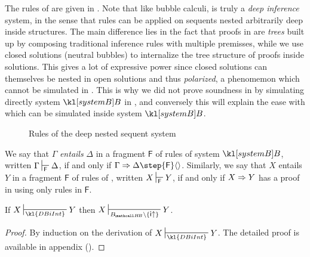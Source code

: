 The rules of  are given in . Note that like
bubble calculi,  is truly a \emph{deep inference} system, in the
sense that rules can be applied on sequents nested arbitrarily deep inside
structures. The main difference lies in the fact that
proofs in  are \emph{trees} built up by composing traditional
inference rules with multiple premisses, while we use closed solutions (neutral
bubbles) to internalize the tree structure of proofs inside solutions. This
gives a lot of expressive power since closed solutions can themselves be nested
in open solutions and thus \emph{polarized}, a phenomemon which cannot be
simulated in . This is why we did not prove soundness in
 by simulating directly system $\sysB$ in
, and conversely this will explain the ease with which 
can be simulated inside system $\sysB$.

\begin{figure*}
  
  \caption{Rules of the deep nested sequent system }
\end{figure*}

\begin{definition}
  We say that $\Gamma$ \emph{entails} $\Delta$ in a fragment $\mathsf{F}$ of
  rules of system $\sysB$, written $\Gamma \prov{\mathsf{F}} \Delta$, if and
  only if $\Gamma \seq \Delta \step{\mathsf{F}} \piq{}$. Similarly, we say
  that $X$ entails $Y$ in a fragment $\mathsf{F}$ of rules of ,
  written $X \prov{\mathsf{F}} Y$, if and only if $X \Rightarrow Y$ has a proof in
   using only rules in $\mathsf{F}$.
\end{definition}

\begin{lemma}
  
  If $X \prov{\kl{DBiInt}} Y$ then $X \prov{\sysBHB \setminus
  \{\rsf{i{\ua}}\}} Y$.
\end{lemma}
\begin{proof}
  By induction on the derivation of $X \prov{\kl{DBiInt}} Y$. The detailed
  proof is available in appendix (). 
\end{proof}

